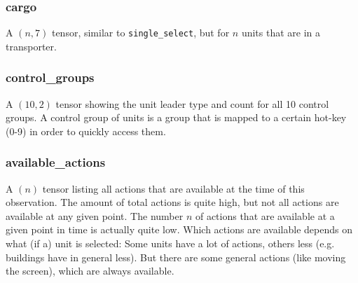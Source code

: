 \documentclass{article}
\begin{document}
\subsubsection{cargo}
A $(n, 7)$ tensor, similar to \texttt{single\_select}, but for $n$ units that are in a transporter.


\subsubsection{control\_groups}
A $(10, 2)$ tensor showing the unit leader type and count for all 10 control 
groups. A control group of units is a group that is mapped to a certain hot-key 
(0-9) in order to quickly access them.


\subsubsection{available\_actions}
A $(n)$ tensor listing all actions that are available at the time of this 
observation. The amount of total actions is quite high, but not all actions are 
available at any given point. The number $n$ of actions that are available at a 
given point in time is actually quite low. Which actions are available depends 
on what (if a) unit is selected: Some units have a lot of actions, others less 
(e.g. buildings have in general less). But there are some general actions (like 
moving the screen), which are always available.
\end{document}
